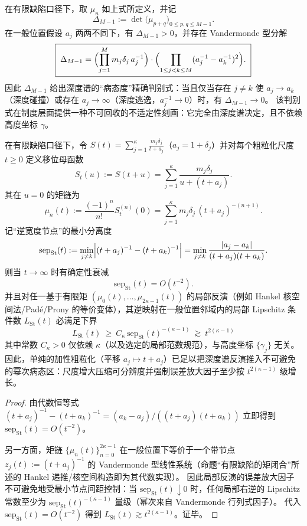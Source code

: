 \begin{proposition}
在有限缺陷口径下，取 \(\mu_n\) 如上式所定义，并记
\[
\Delta_{M-1}:=\det\bigl(\mu_{p+q}\bigr)_{0\le p,q\le M-1}.
\]
在一般位置假设 \(a_j\) 两两不同下，有 \(\Delta_{M-1}>0\)，并存在 Vandermonde 型分解
\[
\boxed{\;
\Delta_{M-1}
=\Bigl(\prod_{j=1}^{M}m_j\delta_j\,a_j^{-1}\Bigr)\cdot
\Bigl(\prod_{1\le j<k\le M}(a_j^{-1}-a_k^{-1})^2\Bigr).\;}
\]
因此 \(\Delta_{M-1}\) 给出深度谱的“病态度”精确判别式：当且仅当存在 \(j\neq k\) 使 \(a_j\to a_k\)（深度碰撞）或存在 \(a_j\to\infty\)（深度逃逸，\(a_j^{-1}\to 0\)）时，有 \(\Delta_{M-1}\to0\)。
该判别式在制度层面提供一种不可回收的不适定性刻画：它完全由深度谱决定，且不依赖高度坐标 \(\gamma\)。
\end{proposition}

\begin{proposition}\label{prop:xi-stieltjes-coarsegraining-illposedness-polynomial}
在有限缺陷口径下，令 \(S(t)=\sum_{j=1}^{\kappa}\frac{m_j\delta_j}{t+a_j}\)（\(a_j=1+\delta_j\)）并对每个粗粒化尺度 \(t\ge 0\) 定义移位母函数
\[
S_t(u):=S(t+u)=\sum_{j=1}^{\kappa}\frac{m_j\delta_j}{u+(t+a_j)}.
\]
其在 \(u=0\) 的矩链为
\[
\mu_n(t):=\frac{(-1)^n}{n!}S_t^{(n)}(0)=\sum_{j=1}^{\kappa}m_j\delta_j\,(t+a_j)^{-(n+1)}.
\]
记“逆宽度节点”的最小分离度
\[
\mathrm{sep}_{\mathrm{St}}(t)
:=\min_{j\ne k}\Bigl|(t+a_j)^{-1}-(t+a_k)^{-1}\Bigr|
=\min_{j\ne k}\frac{|a_j-a_k|}{(t+a_j)(t+a_k)}.
\]
则当 \(t\to\infty\) 时有确定性衰减
\[
\mathrm{sep}_{\mathrm{St}}(t)=O(t^{-2}).
\]
并且对任一基于有限矩 \((\mu_0(t),\dots,\mu_{2\kappa-1}(t))\) 的局部反演（例如 Hankel 核空间法/Pad\'e/Prony 的等价变体），其逆映射在一般位置邻域内的局部 Lipschitz 条件数 \(L_{\mathrm{St}}(t)\) 必满足下界
\[
\boxed{\;
L_{\mathrm{St}}(t)\ \ge\ C_\kappa\,\mathrm{sep}_{\mathrm{St}}(t)^{-(\kappa-1)}\ \gtrsim\ t^{2(\kappa-1)}\;}
\]
其中常数 \(C_\kappa>0\) 仅依赖 \(\kappa\)（以及选定的局部范数规范），与高度坐标 \(\{\gamma_j\}\) 无关。
因此，单纯的加性粗粒化（平移 \(a_j\mapsto t+a_j\)）已足以把深度谱反演推入不可避免的幂次病态区：尺度增大压缩可分辨度并强制误差放大因子至少按 \(t^{2(\kappa-1)}\) 级增长。
\end{proposition}
\begin{proof}
由代数恒等式
\(
(t+a_j)^{-1}-(t+a_k)^{-1}=(a_k-a_j)/((t+a_j)(t+a_k))
\)
立即得到 \(\mathrm{sep}_{\mathrm{St}}(t)=O(t^{-2})\)。
\par
另一方面，矩链 \(\{\mu_n(t)\}_{n=0}^{2\kappa-1}\) 在一般位置下等价于一个带节点
\(
z_j(t):=(t+a_j)^{-1}
\)
的 Vandermonde 型线性系统（命题“有限缺陷的矩闭合”所述的 Hankel 递推/核空间构造即为其代数实现）。
因此局部反演的误差放大因子不可避免地受最小节点间距控制：当 \(\mathrm{sep}_{\mathrm{St}}(t)\downarrow 0\) 时，任何局部右逆的 Lipschitz 常数至少为 \(\mathrm{sep}_{\mathrm{St}}(t)^{-(\kappa-1)}\) 量级（幂次来自 Vandermonde 行列式因子）。
代入 \(\mathrm{sep}_{\mathrm{St}}(t)=O(t^{-2})\) 得到 \(L_{\mathrm{St}}(t)\gtrsim t^{2(\kappa-1)}\)。证毕。
\end{proof}


